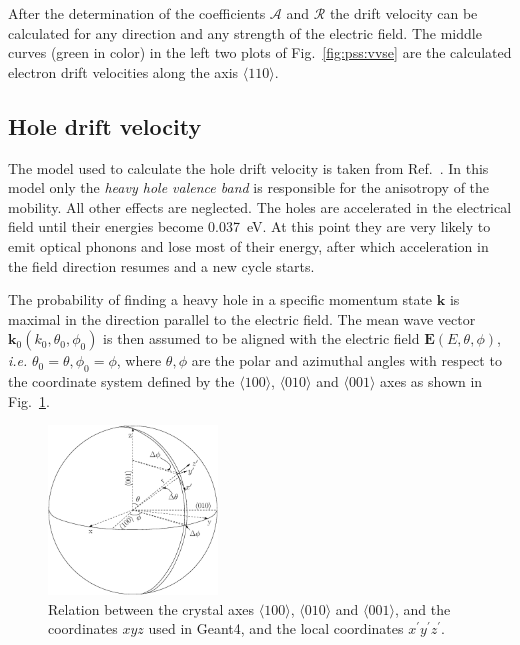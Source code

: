 After the determination of the coefficients $\mathcal{A}$ and $\mathcal{R}$ the drift velocity can be calculated for any direction and any strength of the electric field. The middle curves (green in color) in the left two plots of Fig.~\ref{fig:pss:vvse} are the calculated electron drift velocities along the axis $\langle 110 \rangle$.

\subsection{Hole drift velocity}
\label{sec:pss:hole}
The model used to calculate the hole drift velocity is taken from Ref.~\cite{bart}. In this model only the \emph{heavy hole valence band} is responsible for the anisotropy of the mobility. All other effects are neglected. The holes are accelerated in the electrical field until their energies become 0.037~eV. At this point they are very likely to emit optical phonons and lose most of their energy, after which acceleration in the field direction resumes and a new cycle starts. 

The probability of finding a heavy hole in a specific momentum state $\mathbf{k}$ is maximal in the direction parallel to the electric field. The mean wave vector $\mathbf{k}_{0}(k_{0}, \theta_{0}, \phi_{0})$ is then assumed to be aligned with the electric field $\mathbf{E}(E, \theta, \phi)$, \textit{i.e.} $\theta_{0} = \theta, \phi_{0} = \phi$, where $\theta, \phi$ are the polar and azimuthal angles with respect to the coordinate system defined by the $\langle 100 \rangle$, $\langle 010 \rangle$ and $\langle 001 \rangle$ axes as shown in Fig.~\ref{fig:pss:vsphere}.

\begin{figure}
\centering
\includegraphics[width=0.4\textwidth]{vsphere}  
\caption{Relation between the crystal axes $\langle100\rangle$, $\langle010\rangle$ and $\langle001\rangle$, and the coordinates $xyz$ used in Geant4, and the local coordinates $x^{\prime}y^{\prime}z^{\prime}$.}
\label{fig:pss:vsphere}
\end{figure}

